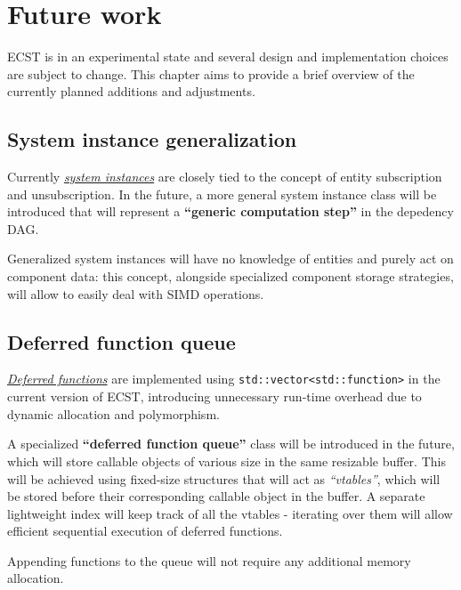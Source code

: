 \documentclass[twoside, 12pt, a4paper, openright]{book}
\begin{document}
\chapter{Future work}\label{future-work}

ECST is in an experimental state and several design and implementation
choices are subject to change. This chapter aims to provide a brief
overview of the currently planned additions and adjustments.

\section{System instance
generalization}\label{system-instance-generalization}

Currently \protect\hyperlink{storage_system}{\emph{system instances}}
are closely tied to the concept of entity subscription and
unsubscription. In the future, a more general system instance class will
be introduced that will represent a \textbf{``generic computation
step''} in the depedency DAG.

Generalized system instances will have no knowledge of entities and
purely act on component data: this concept, alongside specialized
component storage strategies, will allow to easily deal with SIMD
operations.

\section{Deferred function queue}\label{deferred-function-queue}

\protect\hyperlink{flow_exec_dfuncs}{\emph{Deferred functions}} are
implemented using
\texttt{std::vector<std::function>}
in the current version of ECST, introducing unnecessary run-time
overhead due to dynamic allocation and polymorphism.

A specialized \textbf{``deferred function queue''} class will be
introduced in the future, which will store callable objects of various
size in the same resizable buffer. This will be achieved using
fixed-size structures that will act as \emph{``vtables''}, which will be
stored before their corresponding callable object in the buffer. A
separate lightweight index will keep track of all the vtables -
iterating over them will allow efficient sequential execution of
deferred functions.

Appending functions to the queue will not require any additional memory
allocation.
\end{document}
